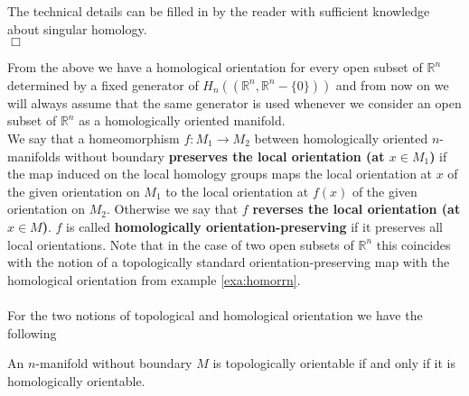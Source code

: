 \begin{prf}
The technical details can be filled in by the reader with sufficient knowledge about singular homology.
\\
\phantom{proven}
\hfill
$\Box$
\end{prf}
From the above we have a homological orientation for every open subset of $\mathbb{R}^{n}$ determined by a fixed generator of $H_{n}((\mathbb{R}^{n},\mathbb{R}^{n} - \lbrace 0 \rbrace))$ and from now on we will always assume that the same generator is used whenever we consider an open subset of $\mathbb{R}^{n}$ as a homologically oriented manifold.
\\
We say that a homeomorphism $f \colon M_{1} \to M_{2}$ between homologically oriented $n$-manifolds without boundary \textbf{preserves the local orientation (at $x \in M_{1}$)} if the map induced on the local homology groups maps the local orientation at $x$ of the given orientation on $M_{1}$ to the local orientation at $f(x)$ of the given orientation on $M_{2}$. Otherwise we say that $f$ \textbf{reverses the local orientation (at $x \in M$)}. $f$ is called \textbf{homologically orientation-preserving} if it preserves all local orientations. Note that in the case of two open subsets of $\mathbb{R}^{n}$ this coincides with the notion of a topologically standard orientation-preserving map with the homological orientation from example \ref{exa:homorrn}.
\\\\
For the two notions of topological and homological orientation we have the following
\\
\begin{thm}
\label{thm:equivtophom}
An $n$-manifold without boundary $M$ is topologically orientable if and only if it is homologically orientable.
\end{thm}
